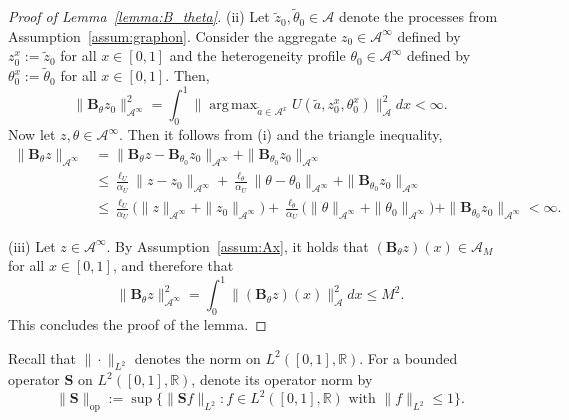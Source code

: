 \documentclass[11pt]{article}
\newcommand{\R}{{\mathbb R}}
\DeclareMathOperator*{\argmax}{arg\,max}
\newcommand{\be}{\begin{equation}}
\newcommand{\ee}{\end{equation}}
\numberwithin{equation}{section}
\begin{document}
\begin{proof}[Proof of Lemma~\ref{lemma:B_theta}]
(ii) Let $\tilde z_0, \tilde\theta_0 \in\mathcal{A}$ denote the processes from Assumption~\ref{assum:graphon}. Consider the aggregate $z_0\in\mathcal{A}^\infty$ defined by $z_0^x:=\tilde z_0$ for all $x\in [0,1]$ and the heterogeneity profile $\theta_0\in\mathcal{A}^\infty$ defined by $\theta_0^x:=\tilde\theta_0$ for all $x\in [0,1]$. Then,
$$
\|\boldsymbol{B}_\theta z_0\|_{\mathcal{A}^\infty}^2=\int_0^1 \big\| \argmax_{\tilde{a}\in \mathcal{A}^x} U(\tilde{a}, z_0^x,\theta_0^x)\big\|_\mathcal{A}^2dx<\infty.
$$
Now let $z,\theta\in\mathcal{A}^\infty$. Then it follows from (i) and the triangle inequality,
\be\begin{aligned}
\|\boldsymbol{B}_\theta z\|_{\mathcal{A}^\infty}&=\|\boldsymbol{B}_\theta z-\boldsymbol{B}_{\theta_0} z_0\|_{\mathcal{A}^\infty}+\|\boldsymbol{B}_{\theta_0} z_0\|_{\mathcal{A}^\infty}\\
&\leq \frac{\ell_U}{\alpha_U}\| z- z_0\|_{\mathcal{A}^\infty}+\frac{\ell_\theta}{\alpha_U}\| \theta- \theta_0\|_{\mathcal{A}^\infty}+\|\boldsymbol{B}_{\theta_0} z_0\|_{\mathcal{A}^\infty}\\
&\leq \frac{\ell_U}{\alpha_U}\big(\| z\|_{\mathcal{A}^\infty}+\| z_0\|_{\mathcal{A}^\infty}\big)+\frac{\ell_\theta}{\alpha_U}\big(\| \theta\|_{\mathcal{A}^\infty}+\| \theta_0\|_{\mathcal{A}^\infty}\big)+\|\boldsymbol{B}_{\theta_0} z_0\|_{\mathcal{A}^\infty}<\infty.
\end{aligned}\ee

(iii) Let $z\in\mathcal{A}^\infty$. By Assumption~\ref{assum:Ax}, it holds that $(\boldsymbol{B}_\theta z)(x)\in\mathcal{A}_M$ for all $x\in [0,1]$, and therefore that
$$
\|\boldsymbol{B}_\theta z\|_{\mathcal{A}^\infty}^2=\int_0^1\|(\boldsymbol{B}_\theta z)(x)\|_\mathcal{A}^2dx\leq M^2.
$$
This concludes the proof of the lemma. 
\end{proof}
Recall that $\|\cdot\|_{L^2}$ denotes the norm on $L^2([0,1],\R)$. For a bounded operator $\boldsymbol{S}$ on $L^2([0,1],\R)$, denote its operator norm by 
\be\label{eq:operator-norm}
\|\boldsymbol{S}\|_{\operatorname{op}}:= \sup\big\{\|\boldsymbol{S}f\|_{L^2} : f\in L^2([0,1],\R)\textrm{ with }\|f\|_{L^2}\leq 1\big\}.
\ee
\end{document}
